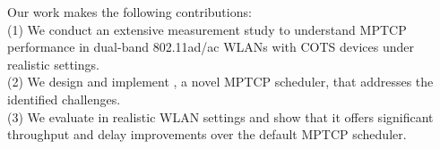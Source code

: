 Our work makes the following contributions:
\\
(1) We conduct an extensive measurement study to understand MPTCP
performance in dual-band 802.11ad/ac WLANs with COTS devices under
realistic settings.
\\
(2) We design and implement \name, a novel MPTCP scheduler, that
addresses the identified challenges.
\\
(3) We evaluate \name in realistic WLAN settings and show that it
offers significant throughput and delay improvements over the default
MPTCP scheduler.
